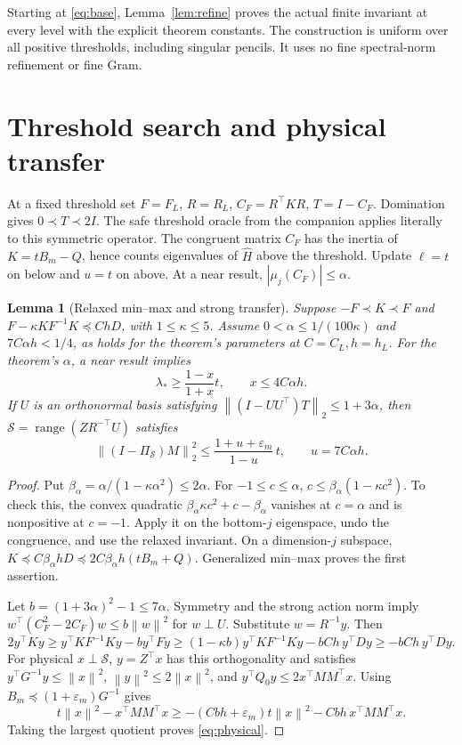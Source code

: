 \documentclass[11pt]{article}
\newtheorem{lemma}[theorem]{Lemma}
\newcommand{\norm}[1]{\left\lVert#1\right\rVert}
\newcommand{\range}{\operatorname{range}}
\begin{document}
Starting at \eqref{eq:base}, Lemma~\ref{lem:refine} proves the actual
finite invariant at every level with the explicit theorem constants.
The construction is uniform over all positive thresholds, including
singular pencils. It uses no fine spectral-norm refinement or fine Gram.

\section{Threshold search and physical transfer}
At a fixed threshold set
\(F=F_L\), \(R=R_L\), \(C_F=R^\top KR\), \(T=I-C_F\).
Domination gives \(0\prec T\prec2I\). The safe threshold oracle from
the companion applies literally to this symmetric operator. The congruent
matrix \(C_F\) has the inertia of \(K=tB_m-Q\), hence counts
eigenvalues of \(\widehat H\) above the threshold.
Update \(\ell=t\) on below and \(u=t\) on above. At a near result,
\(|\mu_j(C_F)|\leq\alpha\).

\begin{lemma}[Relaxed min--max and strong transfer]\label{lem:transfer}
Suppose \(-F\prec K\prec F\) and
\(F-\kappa KF^{-1}K\preceq ChD\), with \(1\leq\kappa\leq5\).
Assume \(0<\alpha\leq1/(100\kappa)\) and \(7C\alpha h<1/4\),
as holds for the theorem's parameters at \(C=C_L,h=h_L\).
For the theorem's \(\alpha\), a near result implies
\[
 \lambda_*\geq\frac{1-x}{1+x}t,\qquad
 x\leq4C\alpha h.
\]
If \(U\) is an orthonormal basis satisfying
\(\norm{(I-UU^\top)T}_2\leq1+3\alpha\), then
\(\mathcal S=\range(ZR^{-\top}U)\) satisfies
\begin{equation}\label{eq:physical}
 \norm{(I-\Pi_{\mathcal S})M}_2^2
 \leq\frac{1+u+\varepsilon_m}{1-u}\,t,
 \qquad u=7C\alpha h.
\end{equation}
\end{lemma}
\begin{proof}
Put \(\beta_\alpha=\alpha/(1-\kappa\alpha^2)\leq2\alpha\).
For \(-1\leq c\leq\alpha\),
\(c\leq\beta_\alpha(1-\kappa c^2)\). To check this, the convex
quadratic \(\beta_\alpha\kappa c^2+c-\beta_\alpha\) vanishes at
\(c=\alpha\) and is nonpositive at \(c=-1\).
Apply it on the bottom-\(j\) eigenspace, undo the congruence, and use
the relaxed invariant. On a dimension-\(j\) subspace,
\(K\preceq C\beta_\alpha hD\preceq2C\beta_\alpha h(tB_m+Q)\).
Generalized min--max proves the first assertion.

Let \(b=(1+3\alpha)^2-1\leq7\alpha\). Symmetry and the strong
action norm imply \(w^\top(C_F^2-2C_F)w\leq b\norm w^2\) for
\(w\perp U\). Substitute \(w=R^{-1}y\). Then
\[
 2y^\top Ky\geq y^\top KF^{-1}Ky-b y^\top Fy
 \geq(1-\kappa b)y^\top KF^{-1}Ky-bCh\,y^\top Dy
 \geq-bCh\,y^\top Dy.
\]
For physical \(x\perp\mathcal S\), \(y=Z^\top x\) has this
orthogonality and satisfies
\(y^\top G^{-1}y\leq\norm x^2\),
\(\norm y^2\leq2\norm x^2\), and
\(y^\top Q_0y\leq2x^\top MM^\top x\).
Using \(B_m\preceq(1+\varepsilon_m)G^{-1}\) gives
\[
 t\norm x^2-x^\top MM^\top x
 \geq-(Cbh+\varepsilon_m)t\norm x^2
       -Cbh\,x^\top MM^\top x.
\]
Taking the largest quotient proves \eqref{eq:physical}.
\end{proof}
\end{document}

